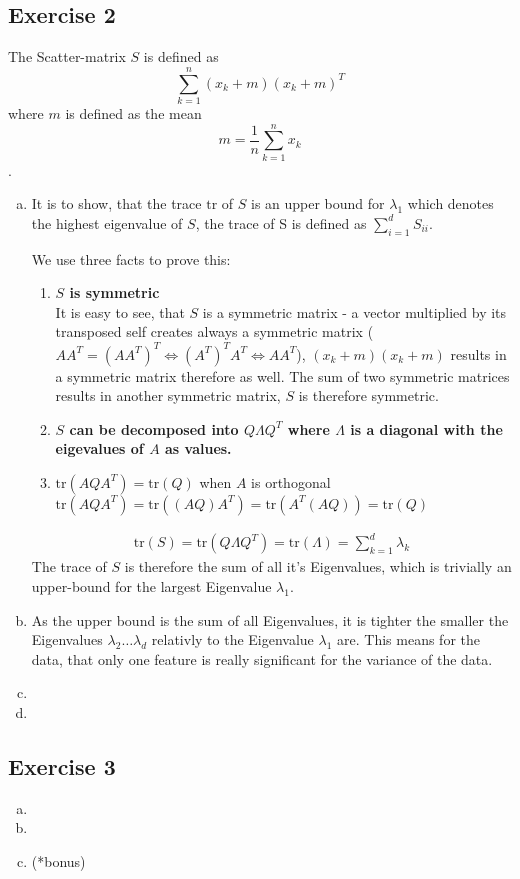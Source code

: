 \documentclass[10pt,a4paper]{article}
\newcommand{\tr}{\text{tr}}
\begin{document}
\subsection*{Exercise 2}
The Scatter-matrix $S$ is defined as $$\sum_{k = 1}^{n} (x_k + m)(x_k + m)^T$$ where $m$ is defined as the mean $$m = \frac{1}{n}\sum_{k=1}^{n}x_k$$. 
\begin{enumerate}[(a)]
\item
It is to show, that the trace $\tr$ of $S$ is an upper bound for $\lambda_1$ which denotes the highest eigenvalue of $S$, the trace of S is defined as $\sum^d_{i=1} S_{ii}$.

We use three facts to prove this:
\begin{enumerate}[1.]
    \item \textbf{$S$ is symmetric} \\
    It is easy to see, that $S$ is a symmetric matrix - a vector multiplied by its transposed self creates always a symmetric matrix ($AA^T = (AA^T)^T \Leftrightarrow (A^T)^TA^T \Leftrightarrow AA^T$), $(x_k + m)(x_k + m)$ results in a symmetric matrix therefore as well. The sum of two symmetric matrices results in another symmetric matrix, $S$ is therefore symmetric.
    \item \textbf{$S$ can be decomposed into $Q\Lambda Q^T$ where $\Lambda$ is a diagonal with the eigevalues of $A$ as values.}
    \item $\tr(AQA^T) = \tr(Q)$ when $A$ is orthogonal \\
    $\tr(AQA^T) = \tr((AQ)A^T) = \tr(A^T(AQ)) = \tr(Q)$
\end{enumerate}

\begin{align*}
\tr(S) = \tr(Q\Lambda Q^T) = \tr(\Lambda) = \sum_{k = 1}^{d} \lambda_k
\end{align*}
The trace of $S$ is therefore the sum of all it's Eigenvalues, which is trivially an upper-bound for the largest Eigenvalue $\lambda_1$. 
\item As the upper bound is the sum of all Eigenvalues, it is tighter the smaller the Eigenvalues $\lambda_2 \dots \lambda_d$ relativly to the Eigenvalue $\lambda_1$ are. This means for the data, that only one feature is really significant for the variance of the data.
\item
\item
\end{enumerate}
\subsection*{Exercise 3}
\begin{enumerate}[(a)]
\item
\item
\item (*bonus)
\end{enumerate}
\end{document}
